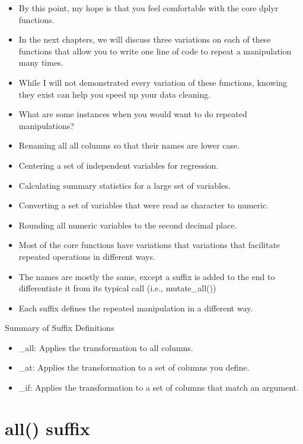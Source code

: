 \documentclass[]{book}
\providecommand{\tightlist}{%
  \setlength{\itemsep}{0pt}\setlength{\parskip}{0pt}}
\theoremstyle{definition}
\theoremstyle{definition}
\theoremstyle{definition}
\theoremstyle{remark}
\begin{document}
\begin{itemize}
\tightlist
\item
  By this point, my hope is that you feel comfortable with the core dplyr functions.
\item
  In the next chapters, we will discuss three variations on each of these functions that allow you to write one line of code to repeat a manipulation many times.
\item
  While I will not demonstrated every variation of these functions, knowing they exist can help you speed up your data cleaning.
\item
  What are some instances when you would want to do repeated manipulations?
\item
  Renaming all all columns so that their names are lower case.
\item
  Centering a set of independent variables for regression.
\item
  Calculating summary statistics for a large set of variables.
\item
  Converting a set of variables that were read as character to numeric.
\item
  Rounding all numeric variables to the second decimal place.
\end{itemize}

\begin{itemize}
\tightlist
\item
  Most of the core functions have variations that variations that facilitate repeated operations in different ways.
\item
  The names are mostly the same, except a suffix is added to the end to differentiate it from its typical call (i.e., mutate\_all())
\item
  Each suffix defines the repeated manipulation in a different way.
\end{itemize}

Summary of Suffix Definitions

\begin{itemize}
\tightlist
\item
  \_all: Applies the transformation to all columns.
\item
  \_at: Applies the transformation to a set of columns you define.
\item
  \_if: Applies the transformation to a set of columns that match an argument.
\end{itemize}

\hypertarget{all-suffix}{%
\section{all() suffix}\label{all-suffix}}
\end{document}
